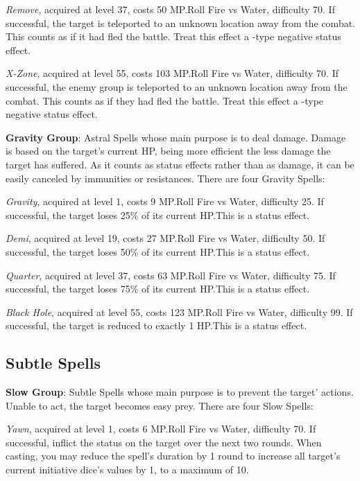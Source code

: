 \begin{multicols}{2}
    \textit{Remove}, acquired at level 37, costs 50 MP.\@{}Roll Fire vs Water, difficulty 70. If successful, the target is teleported to an unknown location away from the combat. This counts as if it had fled the battle. Treat this effect a -type negative status effect.
    
    \textit{X-Zone}, acquired at level 55, costs 103 MP.\@{}Roll Fire vs Water, difficulty 70. If successful, the enemy group is teleported to an unknown location away from the combat. This counts as if they had fled the battle. Treat this effect a -type negative status effect.
    
    \textbf{Gravity Group}: Astral Spells whose main purpose is to deal damage. Damage is based on the target’s current HP, being more efficient the less damage the target has suffered. As it counts as status effects rather than as damage, it can be easily canceled by immunities or resistances. There are four Gravity Spells:
    
    \textit{Gravity}, acquired at level 1, costs 9 MP.\@{}Roll Fire vs Water, difficulty 25. If successful, the target loses 25\% of its current HP.\@{}This is a  status effect.
    
    \textit{Demi}, acquired at level 19, costs 27 MP.\@{}Roll Fire vs Water, difficulty 50. If successful, the target loses 50\% of its current HP.\@{}This is a  status effect.
    
    \textit{Quarter}, acquired at level 37, costs 63 MP.\@{}Roll Fire vs Water, difficulty 75. If successful, the target loses 75\% of its current HP.\@{}This is a  status effect.
    
    \textit{Black Hole}, acquired at level 55, costs 123 MP.\@{}Roll Fire vs Water, difficulty 99. If successful, the target is reduced to exactly 1 HP.\@{}This is a  status effect.
    
    \subsection{Subtle Spells}\label{subsec:time-subtle}

    \textbf{Slow Group}: Subtle Spells whose main purpose is to prevent the target’ actions. Unable to act, the target becomes easy prey. There are four Slow Spells:
    
    \textit{Yawn}, acquired at level 1, costs 6 MP.\@{}Roll Fire vs Water, difficulty 70. If successful, inflict the  status on the target over the next two rounds. When casting, you may reduce the spell's duration by 1 round to increase all target's current initiative dice's values by 1, to a maximum of 10.
    

\end{multicols}
